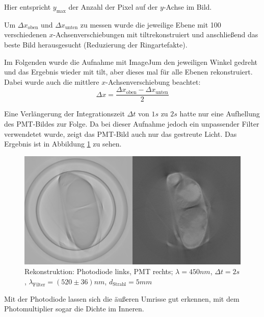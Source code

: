 Hier entspricht $y_\text{max}$ der Anzahl der Pixel auf der $y$-Achse im Bild.

Um $\Delta{x_{\text{oben}}}$ und $\Delta{x_{\text{unten}}}$ zu messen wurde die jeweilige Ebene mit 100 verschiedenen $x$-Achsenverschiebungen mit  \glqq tilt\grqq rekonstruiert und anschließend das beste Bild herausgesucht (Reduzierung der Ringartefakte).

Im Folgenden wurde die Aufnahme mit \glqq ImageJ\grqq um den jeweiligen Winkel gedreht und das Ergebnis wieder mit  \glqq tilt\grqq , aber dieses mal für alle Ebenen rekonstruiert.
Dabei wurde auch die mittlere $x$-Achsenverschiebung beachtet:
$$\Delta{x} = \frac{\Delta{x_{\text{oben}}} - \Delta{x_{\text{unten}}}}{2}$$

Eine Verlängerung der Integrationszeit $\Delta{t}$ von $1 \si{s}$ zu $2 \si{s}$ hatte nur eine Aufhellung des PMT-Bildes zur Folge.
Da bei dieser Aufnahme jedoch ein unpassender Filter verwendetet wurde, zeigt das PMT-Bild auch nur das gestreute Licht. Das Ergebnis ist in Abbildung \ref{fig:lang-int} zu sehen.

\begin{figure}[ht]
\centering
\includegraphics[width=\linewidth]{IMAGE/both-2-450-5-1.png}
\caption{Rekonstruktion: Photodiode links, PMT rechts; $\lambda = 450 \si{nm}$, $\Delta{t} = 2 \si{s}$, $\lambda_\text{Filter} = (520 \pm 36) \si{nm}$, $d_\text{Strahl} = 5 \si{mm}$}
	\label{fig:lang-int}
\end{figure}

Mit der Photodiode lassen sich die äußeren Umrisse gut erkennen, mit dem Photomultiplier sogar die Dichte im Inneren.

